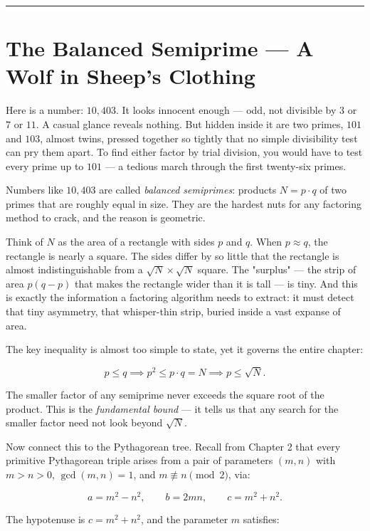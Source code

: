 \documentclass[12pt, letterpaper, openany]{book}
\theoremstyle{definition}
\theoremstyle{remark}
\begin{document}
\bigskip\noindent\rule{\textwidth}{0.4pt}\bigskip



\section*{The Balanced Semiprime --- A Wolf in Sheep's Clothing}


Here is a number: $10{,}403$. It looks innocent enough --- odd, not divisible by $3$ or $7$ or $11$. A casual glance reveals nothing. But hidden inside it are two primes, $101$ and $103$, almost twins, pressed together so tightly that no simple divisibility test can pry them apart. To find either factor by trial division, you would have to test every prime up to $101$ --- a tedious march through the first twenty-six primes.

Numbers like $10{,}403$ are called \textit{balanced semiprimes}: products $N = p \cdot q$ of two primes that are roughly equal in size. They are the hardest nuts for any factoring method to crack, and the reason is geometric.

Think of $N$ as the area of a rectangle with sides $p$ and $q$. When $p \approx q$, the rectangle is nearly a square. The sides differ by so little that the rectangle is almost indistinguishable from a $\sqrt{N} \times \sqrt{N}$ square. The "surplus" --- the strip of area $p(q - p)$ that makes the rectangle wider than it is tall --- is tiny. And this is exactly the information a factoring algorithm needs to extract: it must detect that tiny asymmetry, that whisper-thin strip, buried inside a vast expanse of area.

The key inequality is almost too simple to state, yet it governs the entire chapter:

\[
p \le q \implies p^2 \le p \cdot q = N \implies p \le \sqrt{N}.
\]

The smaller factor of any semiprime never exceeds the square root of the product. This is the \textit{fundamental bound} --- it tells us that any search for the smaller factor need not look beyond $\sqrt{N}$.

Now connect this to the Pythagorean tree. Recall from Chapter 2 that every primitive Pythagorean triple arises from a pair of parameters $(m, n)$ with $m > n > 0$, $\gcd(m, n) = 1$, and $m \not\equiv n \pmod{2}$, via:

\[
a = m^2 - n^2, \qquad b = 2mn, \qquad c = m^2 + n^2.
\]

The hypotenuse is $c = m^2 + n^2$, and the parameter $m$ satisfies:
\end{document}
